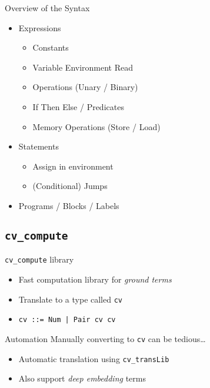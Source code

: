 \documentclass{beamer}
\begin{document}
\begin{frame}{Overview of the Syntax}
  \begin{itemize}
    \item Expressions
    \begin{itemize}
      \item Constants
      \item Variable Environment Read
      \item Operations (Unary / Binary) 
      \item If Then Else / Predicates
      \item Memory Operations (Store / Load)
    \end{itemize}
    \item Statements
      \begin{itemize}
        \item Assign in environment
        \item (Conditional) Jumps  
      \end{itemize}
    \item Programs / Blocks / Labels
  \end{itemize}

\end{frame}



\subsection{\texttt{cv\_compute}}

\begin{frame}{\texttt{cv\_compute} library}
  \begin{itemize}
    \item Fast computation library for \emph{ground terms}
    \item Translate to a type called \texttt{cv}
    \item \texttt{cv ::= Num | Pair cv cv}
  \end{itemize}
\end{frame}

\begin{frame}{Automation}
  Manually converting to \texttt{cv} can be tedious…
  \begin{itemize}
    \item<2-> Automatic translation using \texttt{cv\_transLib}
    \item<2-> Also support \emph{deep embedding} terms
  \end{itemize}

\end{frame}
\end{document}
